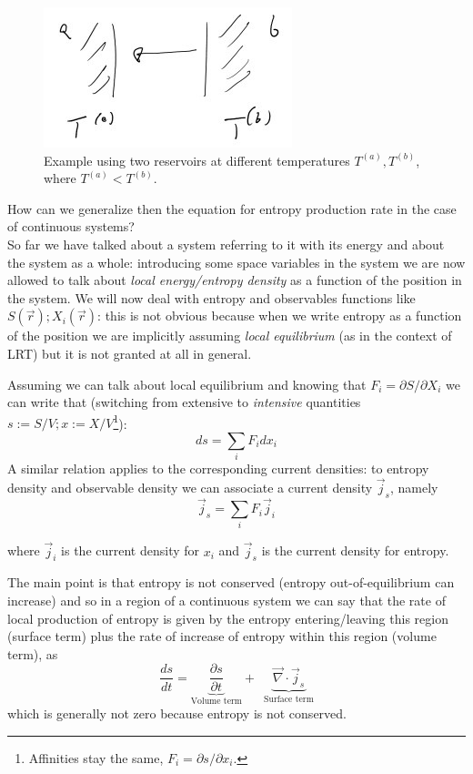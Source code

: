 \documentclass[\main/main.tex]{subfiles}
\begin{document}
\begin{figure}[ht]
    \centering
    \includegraphics[width=0.65\linewidth]{Lectures/Images/reservoirs.jpg}
    \caption{Example using two reservoirs at different temperatures $T^{(a)},T^{(b)}$, where $T^{(a)}<T^{(b)}$.}
    \label{fig:res}
\end{figure}


How can we generalize then the equation for entropy production rate in the case of continuous systems? \\

So far we have talked about a system referring to it with its energy and about the system as a whole: introducing some space variables in the system we are now allowed to talk about \textit{local energy/entropy density} as a function of the position in the system. We will now deal with entropy and observables functions like $S(\Vec{r});X_i(\Vec{r})$: this is not obvious because when we write entropy as a function of the position we are implicitly assuming \textit{local equilibrium} (as in the context of LRT) but it is not granted at all in general.

Assuming we can talk about local equilibrium and knowing that $F_i=\partial S/\partial X_i$ we can write that (switching from extensive to \textit{intensive} quantities $s:=S/V;x:=X/V$\footnote{Affinities stay the same, $ F_i={\partial s}/{\partial x_i}$.}):
\begin{equation}
    ds=\sum_i F_i dx_i
\end{equation}
A similar relation applies to the corresponding current densities: to entropy density and observable density we can associate a current density $\Vec{j}_s$, namely
\begin{equation}
\Vec{j}_s=\sum_iF_i\Vec{j}_i
    \label{eq:changes}  
\end{equation}

where $\Vec{j}_i$ is the current density for $x_i$ and $\Vec{j}_s$ is the current density for entropy.

The main point is that entropy is not conserved (entropy out-of-equilibrium can increase) and so in a region of a continuous system we can say that the rate of local production of entropy
is given by the entropy entering/leaving this region (surface term) plus the rate of increase 
of entropy within this region (volume term), as
\begin{equation}
    \frac{ds}{dt}=\underbrace{\frac{\partial s}{\partial t}}_{\text{Volume term}} +\,\,\,\underbrace{\Vec{\nabla}\cdot \Vec{j}_s}_{\text{Surface term}}
    \label{eq:entr}
\end{equation}
which is generally not zero because entropy is not conserved.
\end{document}
